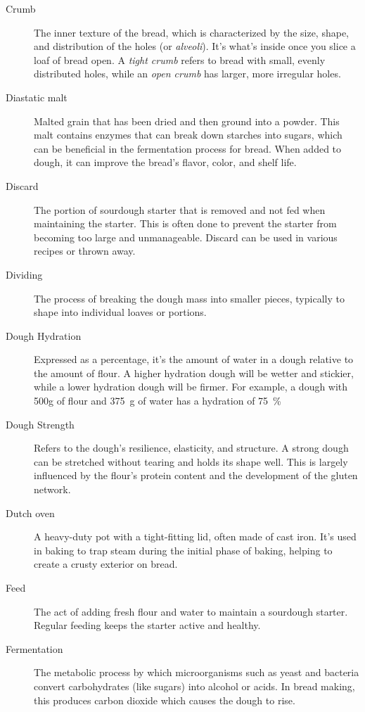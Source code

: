 \begin{description}
\item[Crumb] The inner texture of the bread, which is characterized by the size,
shape, and distribution of the holes (or \emph{alveoli}). It's what's inside once you slice
a loaf of bread open. A \emph{tight crumb} refers to bread with small, evenly distributed
holes, while an \emph{open crumb} has larger, more irregular holes.

\item[Diastatic malt] Malted grain that has been dried and then ground into a powder.
This malt contains enzymes that can break down starches into sugars, which can be
beneficial in the fermentation process for bread. When added to dough, it can improve
the bread's flavor, color, and shelf life.

\item[Discard] The portion of sourdough starter that is removed and not fed when
maintaining the starter. This is often done to prevent the starter from becoming too
large and unmanageable. Discard can be used in various recipes or thrown away.

\item[Dividing] The process of breaking the dough mass into smaller pieces,
typically to shape into individual loaves or portions.

\item[Dough Hydration] Expressed as a percentage, it's the amount of water in a
dough relative to the amount of flour. A higher hydration dough will be wetter and
stickier, while a lower hydration dough will be firmer. For example, a dough with 500g
of flour and \SI{375}{\gram} of water has a hydration of \SI{75}{\percent}

\item[Dough Strength] Refers to the dough's resilience, elasticity, and structure.
A strong dough can be stretched without tearing and holds its shape well. This is
largely influenced by the flour's protein content and the development of the gluten
network.

\item[Dutch oven] A heavy-duty pot with a tight-fitting lid, often made of cast
iron. It's used in baking to trap steam during the initial phase of baking, helping
to create a crusty exterior on bread.

\item[Feed] The act of adding fresh flour and water to maintain a sourdough
starter. Regular feeding keeps the starter active and healthy.

\item[Fermentation] The metabolic process by which microorganisms such as yeast
and bacteria convert carbohydrates (like sugars) into alcohol or acids. In bread
making, this produces carbon dioxide which causes the dough to rise.


\end{description}
